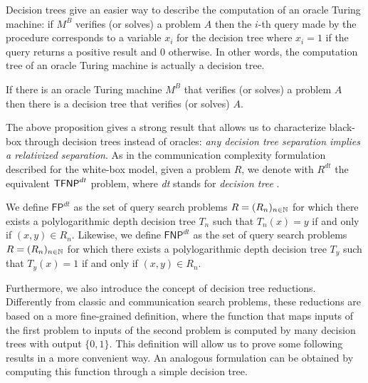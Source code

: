 Decision trees give an easier way to describe the computation of an oracle Turing machine: if $M^B$ verifies (or solves) a problem $A$ then the $i$-th query made by the procedure corresponds to a variable $x_i$ for the decision tree where $x_i = 1$ if the query returns a positive result and 0 otherwise. In other words, the computation tree of an oracle Turing machine is actually a decision tree.

\begin{proposition}
    If there is an oracle Turing machine $M^B$ that verifies (or solves) a problem $A$ then there is a decision tree that verifies (or solves) $A$. 
\end{proposition}

The above proposition gives a strong result that allows us to characterize black-box \TFNP through decision trees instead of oracles: \textit{any decision tree separation implies a relativized separation}. As in the communication complexity formulation described for the white-box model, given a \TFNP problem $R$, we denote with $R^{dt}$ the equivalent $\mathsf{TFNP}^{dt}$ problem, where \textit{dt} stands for \textit{decision tree} \cite{proofs_circuits_communication, tfnp_characterization}.

\begin{definition}
    We define $\mathsf{FP}^{dt}$ as the set of query search problems $R = (R_n)_{n \in \mathbb{N}}$ for which there exists a polylogarithmic depth decision tree $T_n$ such that $T_n(x) = y$ if and only if $(x,y) \in R_n$. Likewise, we define $\mathsf{FNP}^{dt}$ as the set of query search problems $R = (R_n)_{n \in \mathbb{N}}$ for which there exists a polylogarithmic depth decision tree $T_y$ such that $T_y(x) = 1$ if and only if $(x,y) \in R_n$.
\end{definition}

Furthermore, we also introduce the concept of decision tree reductions. Differently from classic and communication search problems, these reductions are based on a more fine-grained definition, where the function that maps inputs of the first problem to inputs of the second problem is computed by many decision trees with output $\{0,1\}$. This definition will allow us to prove some following results in a more convenient way. An analogous formulation can be obtained by computing this function through a simple decision tree. 

